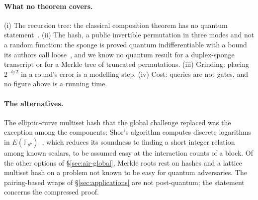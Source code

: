 \paragraph{What no theorem covers.} (i) The recursion tree: the classical composition theorem has no quantum statement~\citep{cgsy24}. (ii) The hash, a public invertible permutation in three modes and not a random function: the sponge is proved quantum indifferentiable with a bound its authors call loose~\citep{acmt25}, and we know no quantum result for a duplex-sponge transcript or for a Merkle tree of truncated permutations. (iii) Grinding: placing $2^{-b/2}$ in a round's error is a modelling step. (iv) Cost: queries are not gates, and no figure above is a running time.

\paragraph{The alternatives.} The elliptic-curve multiset hash that the global challenge replaced was the exception among the components: Shor's algorithm computes discrete logarithms in $E(\mathbb F_{p^7})$~\citep{shor97}, which reduces its soundness to finding a short integer relation among known scalars, to be assumed easy at the interaction counts of a block. Of the other options of \S\ref{sec:air-global}, Merkle roots rest on hashes and a lattice multiset hash on a problem not known to be easy for quantum adversaries. The pairing-based wraps of \S\ref{sec:applications} are not post-quantum; the statement concerns the compressed proof.
